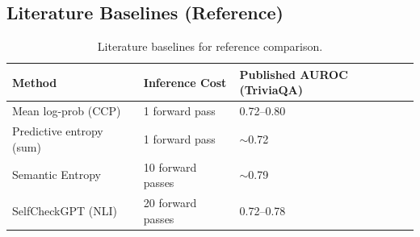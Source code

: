 \subsection*{Literature Baselines (Reference)}

\begin{table}[h]
\centering
\caption{Literature baselines for reference comparison.}
\label{tab:baselines}
\begin{tabular}{lll}
\toprule
Method & Inference Cost & Published AUROC (TriviaQA) \\
\midrule
Mean log-prob (CCP) & 1 forward pass & 0.72--0.80 \\
Predictive entropy (sum) & 1 forward pass & $\sim$0.72 \\
Semantic Entropy & 10 forward passes & $\sim$0.79 \\
SelfCheckGPT (NLI) & 20 forward passes & 0.72--0.78 \\
\bottomrule
\end{tabular}
\end{table}
